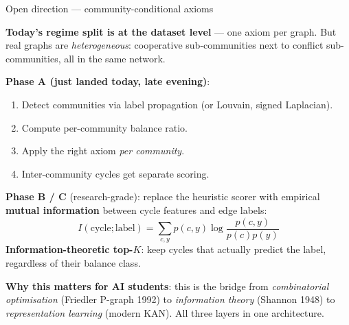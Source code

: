 \documentclass[10pt,aspectratio=169]{beamer}
\begin{document}
\begin{frame}{Open direction --- community-conditional axioms}

\textbf{Today's regime split is at the dataset level} --- one axiom
per graph. But real graphs are \emph{heterogeneous}: cooperative
sub-communities next to conflict sub-communities, all in the same
network.

\medskip

\textbf{Phase A (just landed today, late evening)}:
\begin{enumerate}
\item Detect communities via label propagation (or Louvain, signed
      Laplacian).
\item Compute per-community balance ratio.
\item Apply the right axiom \emph{per community}.
\item Inter-community cycles get separate scoring.
\end{enumerate}

\medskip

\textbf{Phase B / C} (research-grade): replace the heuristic scorer
with empirical \textbf{mutual information} between cycle features
and edge labels:
\[
I(\text{cycle}; \text{label}) = \sum_{c, y} p(c, y)
\log \frac{p(c, y)}{p(c) p(y)}
\]
\textbf{Information-theoretic top-$K$}: keep cycles that actually
predict the label, regardless of their balance class.

\medskip

\textbf{Why this matters for AI students}: this is the bridge from
\emph{combinatorial optimisation} (Friedler P-graph 1992) to
\emph{information theory} (Shannon 1948) to \emph{representation
learning} (modern KAN). All three layers in one architecture.
\end{frame}
\end{document}
